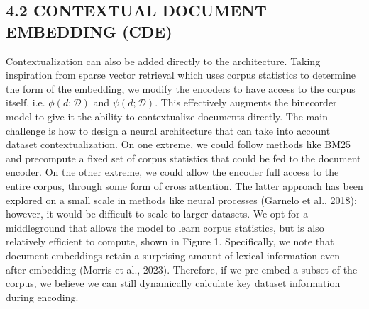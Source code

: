 \begin{tabular}
{\subsection*{4.2 CONTEXTUAL DOCUMENT EMBEDDING (CDE)}
Contextualization can also be added directly to the architecture. Taking inspiration from sparse vector retrieval which uses corpus statistics to determine the form of the embedding, we modify the encoders to have access to the corpus itself, i.e. \(\phi(d ; \mathcal{D})\) and \(\psi(d ; \mathcal{D})\). This effectively augments the binecorder model to give it the ability to contextualize documents directly.
The main challenge is how to design a neural architecture that can take into account dataset contextualization. On one extreme, we could follow methods like BM25 and precompute a fixed set of corpus statistics that could be fed to the document encoder. On the other extreme, we could allow the encoder full access to the entire corpus, through some form of cross attention. The latter approach has been explored on a small scale in methods like neural processes (Garnelo et al., 2018); however, it would be difficult to scale to larger datasets.
We opt for a middleground that allows the model to learn corpus statistics, but is also relatively efficient to compute, shown in Figure 1. Specifically, we note that document embeddings retain a surprising amount of lexical information even after embedding (Morris et al., 2023). Therefore, if we pre-embed a subset of the corpus, we believe we can still dynamically calculate key dataset information during encoding.

}
\end{tabular}
